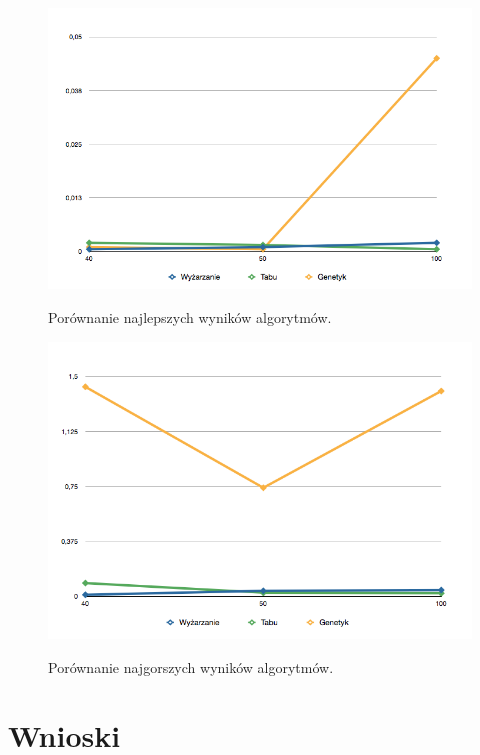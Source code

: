   \begin{figure}[h!]
  \begin{center}
  \caption{Porównanie najlepszych wyników algorytmów.}
  \includegraphics[scale=.6]{images/min.png}
  \label{fig:min}
  \end{center}
  \end{figure}

  \begin{figure}[h!]
  \begin{center}
  \caption{Porównanie najgorszych wyników algorytmów.}
  \includegraphics[scale=.6]{images/max.png}
  \label{fig:max}
  \end{center}
  \end{figure}

\newpage
\section{Wnioski} %
  \label{sec:wnioski}

